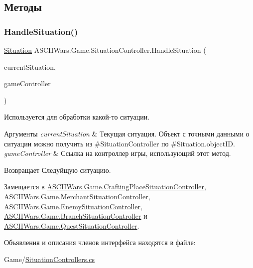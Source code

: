 \subsection{Методы}
\hypertarget{interface_a_s_c_i_i_wars_1_1_game_1_1_situation_controller_a2cf0359dfc1683beb63f0dfed1c372e6}{}\label{interface_a_s_c_i_i_wars_1_1_game_1_1_situation_controller_a2cf0359dfc1683beb63f0dfed1c372e6} 
\subsubsection{\texorpdfstring{Handle\+Situation()}{HandleSituation()}}
{\footnotesize\ttfamily \hyperlink{class_a_s_c_i_i_wars_1_1_game_1_1_situation}{Situation} A\+S\+C\+I\+I\+Wars.\+Game.\+Situation\+Controller.\+Handle\+Situation (\begin{DoxyParamCaption}\item[{\hyperlink{class_a_s_c_i_i_wars_1_1_game_1_1_situation}{Situation}}]{current\+Situation,  }\item[{\hyperlink{class_a_s_c_i_i_wars_1_1_game_1_1_game_controller}{Game\+Controller}}]{game\+Controller }\end{DoxyParamCaption})}



Используется для обработки какой-\/то ситуации. 


\begin{DoxyParams}{Аргументы}
{\em current\+Situation} & Текущая ситуация. Объект с точными данными о ситуации можно получить из \#\+Situation\+Controller по \#\+Situation.\+object\+ID. \\
\hline
{\em game\+Controller} & Ссылка на контроллер игры, использующий этот метод. \\
\hline
\end{DoxyParams}
\begin{DoxyReturn}{Возвращает}
Следуйщую ситуацию. 
\end{DoxyReturn}


Замещается в \hyperlink{class_a_s_c_i_i_wars_1_1_game_1_1_crafting_place_situation_controller_a7e9f8549aa179c520a21039882cea3d7}{A\+S\+C\+I\+I\+Wars.\+Game.\+Crafting\+Place\+Situation\+Controller}, \hyperlink{class_a_s_c_i_i_wars_1_1_game_1_1_merchant_situation_controller_a4048d09077a393377801bf3f3697115b}{A\+S\+C\+I\+I\+Wars.\+Game.\+Merchant\+Situation\+Controller}, \hyperlink{class_a_s_c_i_i_wars_1_1_game_1_1_enemy_situation_controller_a90db7af0d04e0ca4ee9231f63c0a6dd3}{A\+S\+C\+I\+I\+Wars.\+Game.\+Enemy\+Situation\+Controller}, \hyperlink{class_a_s_c_i_i_wars_1_1_game_1_1_branch_situation_controller_abf7662c8744efb91a97ad3aa382f47c7}{A\+S\+C\+I\+I\+Wars.\+Game.\+Branch\+Situation\+Controller} и \hyperlink{class_a_s_c_i_i_wars_1_1_game_1_1_quest_situation_controller_aca719e6a0e79c492e212358b0bb0bc24}{A\+S\+C\+I\+I\+Wars.\+Game.\+Quest\+Situation\+Controller}.



Объявления и описания членов интерфейса находятся в файле\+:\begin{DoxyCompactItemize}
\item 
Game/\hyperlink{_situation_controllers_8cs}{Situation\+Controllers.\+cs}\end{DoxyCompactItemize}
